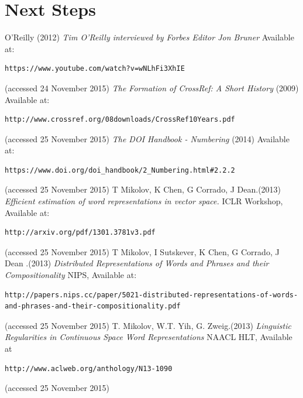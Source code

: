 \documentclass[11pt, oneside]{article}   	%
\begin{document}
\section{Next Steps}
\begin{thebibliography}{9}
 O'Reilly (2012) \emph{Tim O'Reilly interviewed by Forbes Editor Jon Bruner} Available at: \begin{verbatim}https://www.youtube.com/watch?v=wNLhFi3XhIE \end{verbatim} (accessed 24 November 2015)
\emph{The Formation of CrossRef: A Short History} (2009) Available at: \begin{verbatim}http://www.crossref.org/08downloads/CrossRef10Years.pdf\end{verbatim} (accessed 25 November 2015)
\emph{The DOI Handbook - Numbering} (2014) Available at: \begin{verbatim}https://www.doi.org/doi_handbook/2_Numbering.html#2.2.2\end{verbatim} (accessed 25 November 2015) 
T Mikolov, K Chen, G Corrado, J Dean.(2013) \emph{Efficient estimation of word representations in vector space. } ICLR Workshop, Available at: \begin{verbatim}http://arxiv.org/pdf/1301.3781v3.pdf\end{verbatim} (accessed 25 November 2015) 
T Mikolov, I Sutskever, K Chen, G Corrado, J Dean .(2013) \emph{Distributed Representations of Words and Phrases and their Compositionality} NIPS,  Available at: \begin{verbatim}http://papers.nips.cc/paper/5021-distributed-representations-of-words-and-phrases-and-their-compositionality.pdf\end{verbatim} (accessed 25 November 2015) 
T. Mikolov, W.T. Yih, G. Zweig.(2013) \emph{Linguistic Regularities in Continuous Space Word Representations} NAACL HLT, Available at \begin{verbatim}http://www.aclweb.org/anthology/N13-1090\end{verbatim} (accessed 25 November 2015) 

\end{thebibliography}
\end{document}
